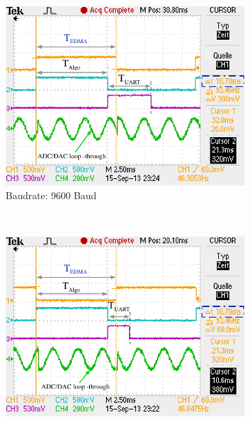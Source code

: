 \begin{figure}
        \centering
        \begin{subfigure}[b]{0.6\textwidth}
                \centering
                \includegraphics[width=\textwidth]{grafiken/04_Echtzeitversuch/Profile_UART_9600}
                \caption{Baudrate: 9600 Baud}
                \label{fig:Profile_UART_9600}
        \end{subfigure}
        ~ %
        \begin{subfigure}[b]{0.6\textwidth}
                \centering
                \includegraphics[width=\textwidth]{grafiken/04_Echtzeitversuch/Profile_UART_19200}

\end{subfigure}
\end{figure}
